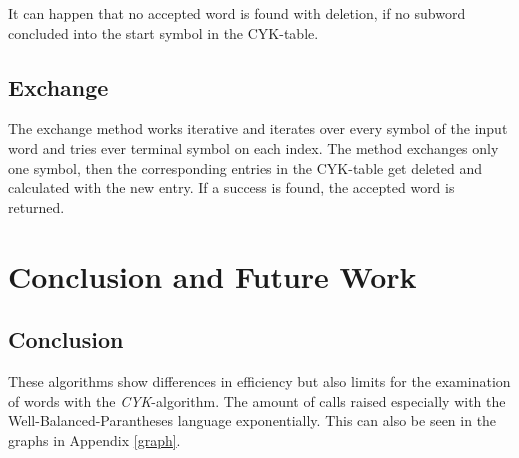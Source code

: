 \documentclass[a4paper, 11pt]{article}
\begin{document}
It can happen that no accepted word is found with deletion, if no subword concluded into the start symbol in the CYK-table.








\subsection{Exchange}
\label{exchange}

The exchange method works iterative and iterates over every symbol of the input word and tries ever terminal symbol on each index. The method exchanges only one symbol, then the corresponding entries in the CYK-table get deleted and calculated with the new entry. If a success is found, the accepted word is returned. 
















\newpage

\section{Conclusion and Future Work}
\label{conclusion}


\subsection{Conclusion}




These algorithms show differences in efficiency but also limits for the examination of words with the \textit{CYK}-algorithm. The amount of calls raised especially with the Well-Balanced-Parantheses language exponentially. This can also be seen in the graphs in Appendix \ref{graph}.
\end{document}
